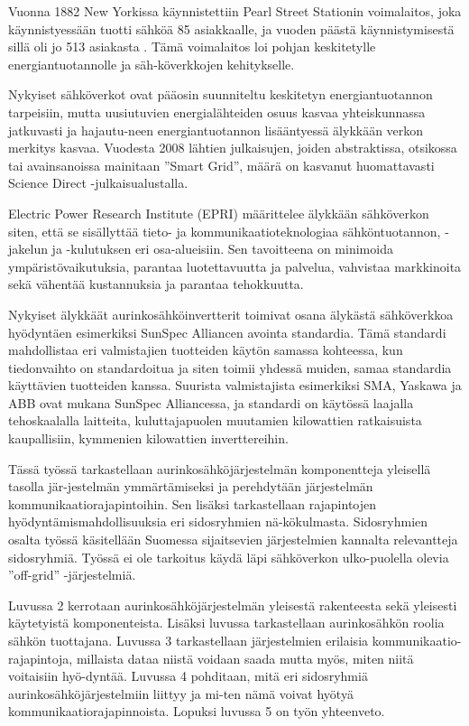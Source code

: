 Vuonna 1882 New Yorkissa käynnistettiin Pearl Street Stationin voimalaitos, joka käynnistyessään tuotti sähköä 85 asiakkaalle, ja vuoden päästä käynnistymisestä sillä oli jo 513 asiakasta \parencite{pearlStreetStation}. Tämä voimalaitos loi pohjan keskitetylle energiantuotannolle ja säh-köverkkojen kehitykselle. 

Nykyiset sähköverkot ovat pääosin suunniteltu keskitetyn energiantuotannon tarpeisiin, mutta uusiutuvien energialähteiden osuus kasvaa yhteiskunnassa jatkuvasti ja hajautu-neen energiantuotannon lisääntyessä älykkään verkon merkitys kasvaa. Vuodesta 2008 lähtien julkaisujen, joiden abstraktissa, otsikossa tai avainsanoissa mainitaan ”Smart Grid”, määrä on kasvanut huomattavasti Science Direct -julkaisualustalla. \parencite{Tuballa&Abundo}

Electric Power Research Institute (EPRI) määrittelee älykkään sähköverkon siten, että se sisällyttää tieto- ja kommunikaatioteknologiaa sähköntuotannon, -jakelun ja -kulutuksen eri osa-alueisiin. Sen tavoitteena on minimoida ympäristövaikutuksia, parantaa luotettavuutta ja palvelua, vahvistaa markkinoita sekä vähentää kustannuksia ja parantaa tehokkuutta. \parencite{SGdefinition}

Nykyiset älykkäät aurinkosähköinvertterit toimivat osana älykästä sähköverkkoa hyödyntäen esimerkiksi SunSpec Alliancen avointa standardia. Tämä standardi mahdollistaa eri valmistajien tuotteiden käytön samassa kohteessa, kun tiedonvaihto on standardoitua ja siten toimii yhdessä muiden, samaa standardia käyttävien tuotteiden kanssa. Suurista valmistajista esimerkiksi SMA, Yaskawa ja ABB ovat mukana SunSpec Alliancessa, ja standardi on käytössä laajalla tehoskaalalla laitteita, kuluttajapuolen muutamien kilowattien ratkaisuista kaupallisiin, kymmenien kilowattien inverttereihin. \parencite{SSProds}

Tässä työssä tarkastellaan aurinkosähköjärjestelmän komponentteja yleisellä tasolla jär-jestelmän ymmärtämiseksi ja perehdytään järjestelmän kommunikaatiorajapintoihin. Sen lisäksi tarkastellaan rajapintojen hyödyntämismahdollisuuksia eri sidosryhmien nä-kökulmasta. Sidosryhmien osalta työssä käsitellään Suomessa sijaitsevien järjestelmien kannalta relevantteja sidosryhmiä. Työssä ei ole tarkoitus käydä läpi sähköverkon ulko-puolella olevia ”off-grid” -järjestelmiä.

Luvussa 2 kerrotaan aurinkosähköjärjestelmän yleisestä rakenteesta sekä yleisesti käytetyistä komponenteista. Lisäksi luvussa tarkastellaan aurinkosähkön roolia sähkön tuottajana. Luvussa 3 tarkastellaan järjestelmien erilaisia kommunikaatio-rajapintoja, millaista dataa niistä voidaan saada mutta myös, miten niitä voitaisiin hyö-dyntää. Luvussa 4 pohditaan, mitä eri sidosryhmiä aurinkosähköjärjestelmiin liittyy ja mi-ten nämä voivat hyötyä kommunikaatiorajapinnoista. Lopuksi luvussa 5 on työn yhteenveto.